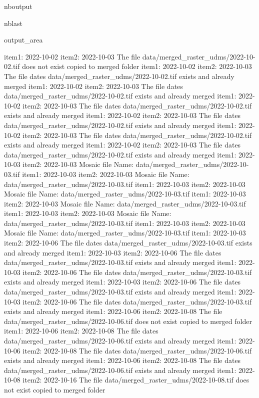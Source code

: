 \documentclass[letterpaper,10pt]{sphinxmanual}
\begin{document}
\begin{sphinxuseclass}{nboutput}
\begin{sphinxuseclass}{nblast}
{\begin{sphinxuseclass}{output_area}
\begin{sphinxuseclass}{}
\begin{sphinxVerbatim}[commandchars=\\\{\}]
item1:  2022-10-02
item2:  2022-10-03
The file data/merged\_raster\_udms/2022-10-02.tif does not exist copied to merged folder
item1:  2022-10-02
item2:  2022-10-03
The file dates data/merged\_raster\_udms/2022-10-02.tif exists and already merged
item1:  2022-10-02
item2:  2022-10-03
The file dates data/merged\_raster\_udms/2022-10-02.tif exists and already merged
item1:  2022-10-02
item2:  2022-10-03
The file dates data/merged\_raster\_udms/2022-10-02.tif exists and already merged
item1:  2022-10-02
item2:  2022-10-03
The file dates data/merged\_raster\_udms/2022-10-02.tif exists and already merged
item1:  2022-10-02
item2:  2022-10-03
The file dates data/merged\_raster\_udms/2022-10-02.tif exists and already merged
item1:  2022-10-02
item2:  2022-10-03
The file dates data/merged\_raster\_udms/2022-10-02.tif exists and already merged
item1:  2022-10-03
item2:  2022-10-03
Mosaic file Name:  data/merged\_raster\_udms/2022-10-03.tif
item1:  2022-10-03
item2:  2022-10-03
Mosaic file Name:  data/merged\_raster\_udms/2022-10-03.tif
item1:  2022-10-03
item2:  2022-10-03
Mosaic file Name:  data/merged\_raster\_udms/2022-10-03.tif
item1:  2022-10-03
item2:  2022-10-03
Mosaic file Name:  data/merged\_raster\_udms/2022-10-03.tif
item1:  2022-10-03
item2:  2022-10-03
Mosaic file Name:  data/merged\_raster\_udms/2022-10-03.tif
item1:  2022-10-03
item2:  2022-10-03
Mosaic file Name:  data/merged\_raster\_udms/2022-10-03.tif
item1:  2022-10-03
item2:  2022-10-06
The file dates data/merged\_raster\_udms/2022-10-03.tif exists and already merged
item1:  2022-10-03
item2:  2022-10-06
The file dates data/merged\_raster\_udms/2022-10-03.tif exists and already merged
item1:  2022-10-03
item2:  2022-10-06
The file dates data/merged\_raster\_udms/2022-10-03.tif exists and already merged
item1:  2022-10-03
item2:  2022-10-06
The file dates data/merged\_raster\_udms/2022-10-03.tif exists and already merged
item1:  2022-10-03
item2:  2022-10-06
The file dates data/merged\_raster\_udms/2022-10-03.tif exists and already merged
item1:  2022-10-06
item2:  2022-10-08
The file data/merged\_raster\_udms/2022-10-06.tif does not exist copied to merged folder
item1:  2022-10-06
item2:  2022-10-08
The file dates data/merged\_raster\_udms/2022-10-06.tif exists and already merged
item1:  2022-10-06
item2:  2022-10-08
The file dates data/merged\_raster\_udms/2022-10-06.tif exists and already merged
item1:  2022-10-06
item2:  2022-10-08
The file dates data/merged\_raster\_udms/2022-10-06.tif exists and already merged
item1:  2022-10-08
item2:  2022-10-16
The file data/merged\_raster\_udms/2022-10-08.tif does not exist copied to merged folder

\end{sphinxVerbatim}
\end{sphinxuseclass}
\end{sphinxuseclass}}
\end{sphinxuseclass}
\end{sphinxuseclass}
\end{document}
